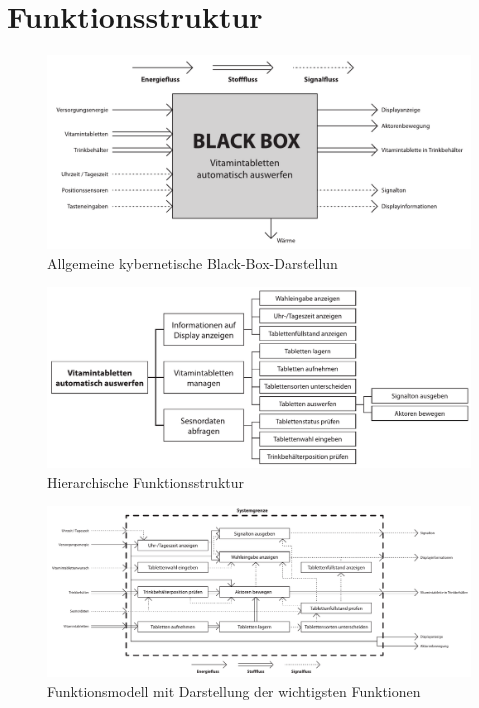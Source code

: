 \newpage
\section{Funktionsstruktur}

\begin{figure}[H]
	\centering
	\includegraphics[width=1.0\linewidth]{../drawings/funktionsstruktur_kybernetisch}
	\caption{Allgemeine kybernetische Black-Box-Darstellun}
	\label{fig:funktionsstrukturkybernetisch}
\end{figure}

\begin{figure}[H]
	\centering
	\includegraphics[width=1.0\linewidth]{chapter/Bilder/funktionsstruktur_hierarchisch}
	\caption{Hierarchische Funktionsstruktur}
	\label{fig:funktionsstrukturhierarchisch}
\end{figure}

\begin{figure}[H]
	\centering
	\includegraphics[angle=90, height=0.9\textheight]{chapter/Bilder/funktionsmodell}
	\caption{Funktionsmodell mit Darstellung der  wichtigsten Funktionen}
	\label{fig:funktionsmodell}
\end{figure}


